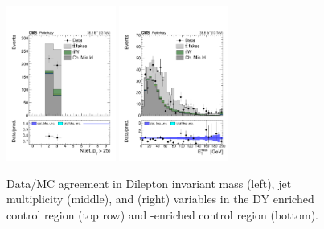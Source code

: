 \begin{figure}[htb]
        \includegraphics[width=0.32\textwidth]{ch10_figs/chargeFlip_closureTt/nJet25.pdf}
        \includegraphics[width=0.32\textwidth]{ch10_figs/chargeFlip_closureTt/met.pdf}
        \caption[Data/MC agreement in charge flip control regions]{Data/MC agreement in Dilepton invariant mass (left), jet multiplicity (middle), and \met (right) variables
        in the DY enriched control region (top row) and \ttbar-enriched control region (bottom).}
        \label{fig:chargeFlip_cr}
\end{figure}
